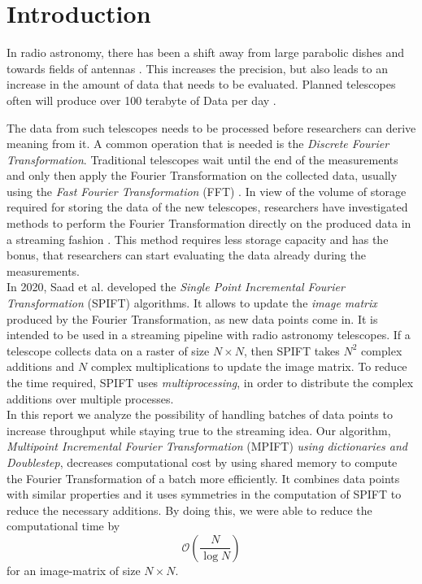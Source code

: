 \documentclass[12pt]{article}
\begin{document}
\tableofcontents
\newpage

\section{Introduction}

In radio astronomy, there has been a shift away from large parabolic dishes and towards fields of antennas \cite{biem2010streaming}. This increases the precision, but also leads to an increase in the amount of data that needs to be evaluated. Planned telescopes often will produce over 100 terabyte of Data per day \cite{van2011correlating}.

The data from such telescopes needs to be processed before researchers can derive meaning from it. A common operation that is needed is the \emph{Discrete Fourier Transformation}. Traditional telescopes wait until the end of the measurements and only then apply the Fourier Transformation on the collected data, usually using the \emph{Fast Fourier Transformation} (FFT) \cite{richard2017interferometry}. In view of the volume of storage required for storing the data of the new telescopes, researchers have investigated methods to perform the Fourier Transformation directly on the produced data in a streaming fashion \cite{biem2010streaming}. This method requires less storage capacity and has the bonus, that researchers can start evaluating the data already during the measurements.\\

In 2020, Saad et al. \cite{spift} developed the \emph{Single Point Incremental Fourier Transformation} (SPIFT) algorithms. It allows to update the \emph{image matrix} produced by the Fourier Transformation, as new data points come in. It is intended to be used in a streaming pipeline with radio astronomy telescopes. If a telescope collects data on a raster of size $N\times N$, then SPIFT takes $N^2$ complex additions and $N$ complex multiplications to update the image matrix. To reduce the time required, SPIFT uses \emph{multiprocessing}, in order to distribute the complex additions over multiple processes.\\

In this report we analyze the possibility of handling batches of data points to increase throughput while staying true to the streaming idea. Our algorithm, \emph{Multipoint Incremental Fourier Transformation} (MPIFT) \emph{using dictionaries and Doublestep}, decreases computational cost by using shared memory to compute the Fourier Transformation of a batch more efficiently. It combines data points with similar properties and it uses symmetries in the computation of SPIFT to reduce the necessary additions. By doing this, we were able to reduce the computational time by \[
\mathcal{O}(\frac{N}{\log{N}})
\]
for an image-matrix of size $N\times N$. 
\end{document}
